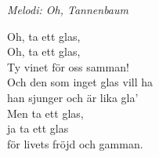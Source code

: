 {\footnotesize\textit{Melodi: Oh, Tannenbaum}}\par
\vspace{10pt}
Oh, ta ett glas,\\
Oh, ta ett glas,\\
Ty vinet för oss samman!\\
Och den som inget glas vill ha\\
han sjunger och är lika gla'\\
Men ta ett glas,\\
ja ta ett glas\\
för livets fröjd och gamman.
